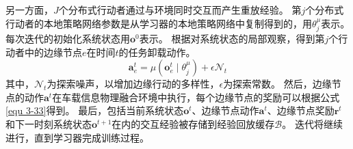 另一方面，$J$个分布式行动者通过与环境同时交互而产生重放经验。
第$j$个分布式行动者的本地策略网络参数是从学习器的本地策略网络中复制得到的，用$\theta^{\mu}_{j}$表示。
每次迭代的初始化系统状态用$\boldsymbol{o}^{0}$表示。
根据对系统状态的局部观察，得到第$j$个行动者中的边缘节点$e$在时间$t$的任务卸载动作。
\begin{equation}
	\boldsymbol{a}_{e}^{t}={\mu}\left(\boldsymbol{o}_{e}^{t} \mid \theta^{\mu}_{j}\right)+\epsilon  \mathcal{N}_{t}
\end{equation}
\noindent 其中，$\mathcal{N}_{t}$为探索噪声，以增加边缘行动的多样性，$\epsilon$为探索常数。
然后，边缘节点的动作$\boldsymbol{a}^{t}$在车载信息物理融合环境中执行，每个边缘节点的奖励可以根据公式\ref{equ 3-33}得到。
最后，包括当前系统状态$\boldsymbol{o}^{t}$、边缘节点动作$\boldsymbol{a}^{t}$、边缘节点奖励$\boldsymbol{r}^{t}$和下一时刻系统状态$\boldsymbol{o}^{t+1}$在内的交互经验被存储到经验回放缓存$\mathcal{B}$。
迭代将继续进行，直到学习器完成训练过程。


